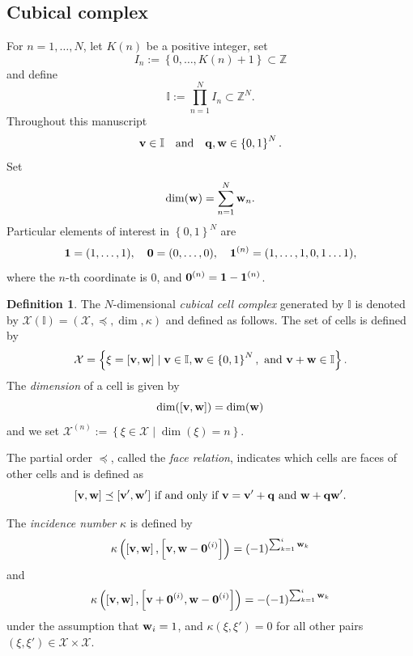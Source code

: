 \documentclass[12pt, notitlepage]{amsart}
\newcommand{\setof}[1]{\left\{ {#1}\right\}}
\newcommand{\bq}{{\bf q}}
\newcommand{\bv}{{\bf v}}
\newcommand{\bw}{{\bf w}}
\newcommand{\I}{{\mathbb{I}}}
\newcommand{\Z}{{\mathbb{Z}}}
\newcommand{\cX}{{\mathcal X}}
\theoremstyle{definition}
\newtheorem{defn}[thm]{Definition}
\begin{document}
  \subsection{Cubical complex}
  \label{section:wall}

  For $n=1,\ldots, N$, let $K(n)$ be a positive integer, set
  \[
    I_n := \setof{0,\ldots, K(n)+1} \subset \Z
  \]
  and define
  \begin{equation}
    \label{eq:II}
    \I := \prod_{n=1}^N I_n\subset \Z^N.
  \end{equation}
  Throughout this manuscript
  \[
    \bv\in \I \quad \text{and} \quad \bq,\bw\in \setof{0,1}^N.
  \]
  Set
  \[
    \dim(\bw) = \sum_{n=1}^N \bw_n.
  \]
  Particular elements of interest in $\setof{0,1}^N$ are
  \[
    {\bf 1}=(1,\ldots, 1), \quad {\bf 0}=(0,\ldots, 0), \quad {\bf 1}^{(n)}=(1,\ldots,1,0,1\ldots 1),
  \]
  where  the $n$-th coordinate is $0$,  and ${\bf 0}^{(n)} = {\bf 1}-{\bf 1}^{(n)}$.

  \begin{defn}
    \label{defn:Xcomplex}
    The $N$-dimensional \emph{cubical cell complex} generated by  $\I$ is denoted by $\cX(\I) = (\cX,\preceq,\dim,\kappa)$ and defined as follows. The set of cells is
    defined by
    \[
      \cX = \setof{ \xi = [\bv,\bw] \mid \bv\in \I, \bw\in \setof{0,1}^N, \text{ and } \bv + \bw \in \I}.
    \]
    The \emph{dimension} of a cell is given by
    \[
      \dim([\bv,\bw]) = \dim(\bw)
    \]
    and we set $\cX^{(n)} := \setof{\xi\in\cX \mid \dim(\xi) = n}$.

    The partial order $\preceq$, called the \emph{face relation}, indicates which cells are faces of other cells and is defined as
    \begin{equation}\label{eq:is_a_face}
      [\bv,\bw]\preceq[\bv',\bw']\ \text{if and only if $\bv = \bv'+\bq$ and $\bw +\bq \bw'$}.
    \end{equation}

    The \emph{incidence number} $\kappa$ is defined by
    \[
      \kappa\left( \left[\bv,\bw \right], \left[ \bv,\bw - {\bf 0}^{(i)}\right] \right) = (-1)^{\sum_{k=1}^i \bw_k}
    \]
    and
    \[
      \kappa\left( \left[\bv,\bw \right], \left[ \bv +{\bf 0}^{(i)} ,\bw - {\bf 0}^{(i)}\right] \right) = - (-1)^{\sum_{k=1}^i \bw_k}
    \]
    under the assumption that $\bw_i = 1$, and $\kappa(\xi, \xi') = 0$ for all other pairs $(\xi, \xi') \in \cX \times \cX$.
  \end{defn}
\end{document}
